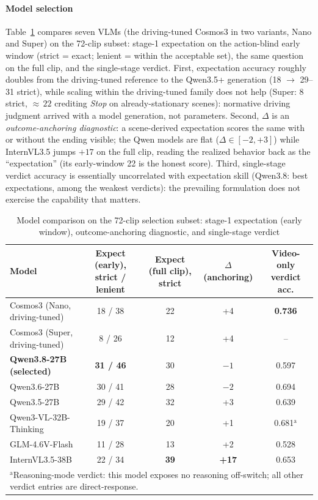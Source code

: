 \documentclass[conference]{IEEEtran}
\begin{document}
\paragraph{Model selection} Table~\ref{tab:models} compares seven VLMs (the driving-tuned Cosmos3 in two variants, Nano and Super) on the 72-clip subset: stage-1 expectation on the action-blind early window (strict = exact; lenient = within the acceptable set), the same question on the full clip, and the single-stage verdict. First, expectation accuracy roughly doubles from the driving-tuned reference to the Qwen3.5+ generation (18 $\rightarrow$ 29--31 strict), while scaling within the driving-tuned family does not help (Super: 8 strict, ${\approx}\,22$ crediting \emph{Stop} on already-stationary scenes): normative driving judgment arrived with a model generation, not parameters. Second, $\Delta$ is an \emph{outcome-anchoring diagnostic}: a scene-derived expectation scores the same with or without the ending visible; the Qwen models are flat ($\Delta \in [-2, +3]$) while InternVL3.5 jumps $+17$ on the full clip, reading the realized behavior back as the ``expectation'' (its early-window 22 is the honest score). Third, single-stage verdict accuracy is essentially uncorrelated with expectation skill (Qwen3.8: best expectations, among the weakest verdicts): the prevailing formulation does not exercise the capability that matters.

\begin{table}[htbp]
\caption{Model comparison on the 72-clip selection subset: stage-1 expectation (early window), outcome-anchoring diagnostic, and single-stage verdict}
\begin{center}
\footnotesize
\begin{tabular}{|l|c|c|c|c|}
\hline
\textbf{Model} & \textbf{Expect (early), strict / lenient} & \textbf{Expect (full clip), strict} & \textbf{$\Delta$ (anchoring)} & \textbf{Video-only verdict acc.} \\
\hline
Cosmos3 (Nano, driving-tuned) \cite{b11,b30} & 18 / 38 & 22 & +4 & \textbf{0.736} \\
\hline
Cosmos3 (Super, driving-tuned) & 8 / 26 & 12 & +4 & -- \\
\hline
\textbf{Qwen3.8-27B (selected)} & \textbf{31 / 46} & 30 & $-1$ & 0.597 \\
\hline
Qwen3.6-27B & 30 / 41 & 28 & $-2$ & 0.694 \\
\hline
Qwen3.5-27B & 29 / 42 & 32 & +3 & 0.639 \\
\hline
Qwen3-VL-32B-Thinking & 19 / 37 & 20 & +1 & 0.681$^{\mathrm{a}}$ \\
\hline
GLM-4.6V-Flash & 11 / 28 & 13 & +2 & 0.528 \\
\hline
InternVL3.5-38B & 22 / 34 & \textbf{39} & \textbf{+17} & 0.653 \\
\hline
\multicolumn{5}{l}{$^{\mathrm{a}}$Reasoning-mode verdict: this model exposes no reasoning off-switch; all other verdict entries are direct-response.}
\end{tabular}
\label{tab:models}
\end{center}
\end{table}
\end{document}
